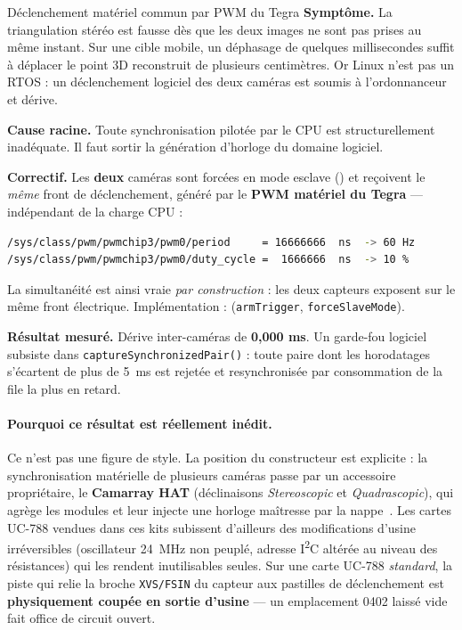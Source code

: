 \documentclass[11pt,a4paper]{article}
\begin{document}
\begin{verroulevé}{Déclenchement matériel commun par PWM du Tegra}
\textbf{Symptôme.} La triangulation stéréo est fausse dès que les deux images ne sont pas
prises au même instant. Sur une cible mobile, un déphasage de quelques millisecondes
suffit à déplacer le point 3D reconstruit de plusieurs centimètres. Or Linux n'est pas un
RTOS : un déclenchement logiciel des deux caméras est soumis à l'ordonnanceur et dérive.

\textbf{Cause racine.} Toute synchronisation pilotée par le CPU est structurellement
inadéquate. Il faut sortir la génération d'horloge du domaine logiciel.

\textbf{Correctif.} Les \textbf{deux} caméras sont forcées en mode esclave
() et reçoivent le \emph{même} front de déclenchement, généré par
le \textbf{PWM matériel du Tegra} — indépendant de la charge CPU :

\begin{lstlisting}[language=bash]
/sys/class/pwm/pwmchip3/pwm0/period     = 16666666  ns  -> 60 Hz
/sys/class/pwm/pwmchip3/pwm0/duty_cycle =  1666666  ns  -> 10 %
\end{lstlisting}

La simultanéité est ainsi vraie \emph{par construction} : les deux capteurs exposent sur le
même front électrique. Implémentation : 
(\texttt{armTrigger}, \texttt{forceSlaveMode}).

\textbf{Résultat mesuré.} Dérive inter-caméras de \textbf{0,000 ms}. Un garde-fou logiciel
subsiste dans \texttt{captureSynchronizedPair()} : toute paire dont les horodatages
s'écartent de plus de 5~ms est rejetée et resynchronisée par consommation de la file la
plus en retard.
\end{verroulevé}

\paragraph{Pourquoi ce résultat est réellement inédit.} Ce n'est pas une figure de style. La
position du constructeur est explicite : la synchronisation matérielle de plusieurs caméras
passe par un accessoire propriétaire, le \textbf{Camarray HAT} (déclinaisons
\emph{Stereoscopic} et \emph{Quadrascopic}), qui agrège les modules et leur injecte une
horloge maîtresse par la nappe~\cite{arducam_uc788}. Les cartes UC-788 vendues dans ces kits
subissent d'ailleurs des modifications d'usine irréversibles (oscillateur 24~MHz non peuplé,
adresse I\textsuperscript{2}C altérée au niveau des résistances) qui les rendent inutilisables
seules. Sur une carte UC-788 \emph{standard}, la piste qui relie la broche \texttt{XVS/FSIN}
du capteur aux pastilles de déclenchement est \textbf{physiquement coupée en sortie
d'usine} — un emplacement 0402 laissé vide fait office de circuit ouvert.
\end{document}
